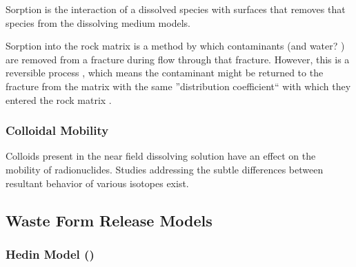 Sorption is the interaction of a dissolved species with surfaces that removes
that species from the dissolving medium models.


Sorption into the rock matrix is a method by which contaminants (and water? ) %
are removed from a fracture during flow through that fracture. However, this is 
a reversible process \cite{ahn_mass_1988}, which means the contaminant 
might be returned to the fracture from the matrix with the same ''distribution 
coefficient`` with which they entered the rock matrix . 








\subsubsection{Colloidal Mobility}

Colloids present in the near field dissolving solution have an effect on the
mobility of radionuclides. Studies addressing the subtle differences between 
resultant behavior of various isotopes exist.

\subsection{Waste Form Release Models}

\subsubsection{Hedin Model (\cite{hedin_integrated_2002})}

